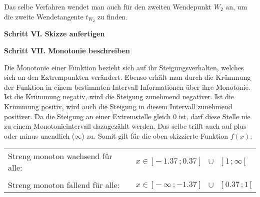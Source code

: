 Das selbe Verfahren wendet man auch f\"{u}r den zweiten Wendepunkt $W_{2}$ an, um die zweite Wendetangente $t_{W_{2}}$ zu finden.

\textbf{Schritt VI. Skizze anfertigen}

\begin{figure}[h!]
\end{figure}

\textbf{Schritt VII. Monotonie beschreiben}

Die Monotonie einer Funktion bezieht sich auf ihr Steigungsverhalten, welches sich an den Extrempunkten ver\"{a}ndert. Ebenso erh\"{a}lt man durch die Kr\"{u}mmung der Funktion in einem bestimmten Intervall Informationen \"{u}ber ihre Monotonie. Ist die Kr\"{u}mmung negativ, wird die Steigung zunehmend negativer. Ist die Kr\"{u}mmung positiv, wird auch die Steigung in diesem Intervall zunehmend positiver. Da die Steigung an einer Extremstelle gleich 0 ist, darf diese Stelle nie zu einem Monotonieintervall dazugez\"{a}hlt werden. Das selbe trifft auch auf plus oder minus unendlich ($\infty$) zu. Somit gilt f\"{u}r die oben skizzierte Funktion $f(x)$:

\begin{tabular}{l l l l}
	Streng monoton wachsend f\"{u}r alle: & $x \in \,] -1.37\,; 0.37\,[$ & $\cup$ & $]\, 1\,; \infty \, [$
	\\
	&&&
	\\
	Streng monoton fallend f\"{u}r alle: & $x \in \,] -\infty\,; -1.37\,[$ & $\cup$ & $] \, 0.37\,; 1 \, [$
\end{tabular}

\pagebreak

